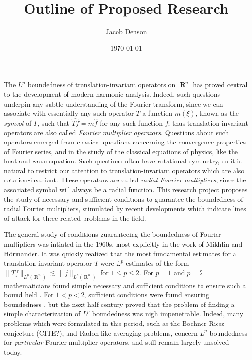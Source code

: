\documentclass[12pt]{article}
\title{Outline of Proposed Research}
\author{Jacob Denson}
\date{\today}
\DeclareMathOperator{\RR}{\mathbf{R}}
\theoremstyle{plain}
\theoremstyle{remark}
\theoremstyle{definition}
\begin{document}
\maketitle

The $L^p$ boundedness of translation-invariant operators on $\RR^n$ has proved central to the development of modern harmonic analysis. 
Indeed, such questions underpin any subtle understanding of the Fourier transform, since we can associate with essentially any such operator $T$ a function $m(\xi)$, known as the \emph{symbol} of $T$, such that $\widehat{Tf} = m \widehat{f}$ for any such function $f$; thus translation invariant operators are also called \emph{Fourier multiplier operators}. Questions about such operators emerged from classical questions concerning the convergence properties of Fourier series, and in the study of the classical equations of physics, like the heat and wave equation. Such questions often have rotational symmetry, so it is natural to restrict our attention to translation-invariant operators which are also rotation-invariant. These operators are called \emph{radial Fourier multipliers}, since the associated symbol will always be a radial function. This research project proposes the study of necessary and sufficient conditions to guarantee the boundedness of radial Fourier multipliers, stimulated by recent developments which indicate lines of attack for three related problems in the field.

The general study of conditions guaranteeing the boundedness of Fourier multipliers was intiated in the 1960s, most explicitly in the work of Mikhlin and H\"{o}rmander. It was quickly realized that the most fundamental estimates for a translation-invariant operator $T$ were $L^p$ estimates of the form $\| Tf \|_{L^p(\RR^n)} \lesssim \| f \|_{L^p(\RR^n)}$ for $1 \leq p \leq 2$. For $p = 1$ and $p = 2$ mathematicians found simple necessary and sufficient conditions to ensure such a bound held \cite{Hormander1}. For $1 < p < 2$, sufficient conditions were found ensuring boundedness \cite{Mikhlin}, but the next half century proved that the problem of finding a simple characterization of $L^p$ boundedness was nigh impenetrable. Indeed, many problems which were formulated in this period, such as the Bochner-Riesz conjecture (CITE?), and Radon-like averaging problems, concern $L^p$ boundedness for \emph{particular} Fourier multiplier operators, and still remain largely unsolved today.
\end{document}
